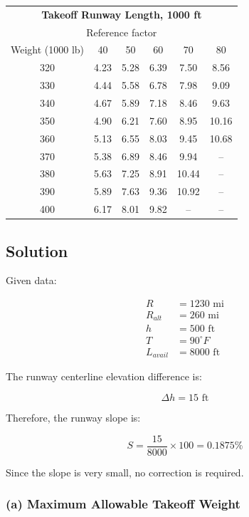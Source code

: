 \documentclass{KPS_assignment}
\begin{document}
\begin{table}[h!]
\begin{tabular}{c|ccccc}
\hline
\multicolumn{6}{c}{\textbf{Takeoff Runway Length, 1000 ft}} \\
\multicolumn{6}{c}{Reference factor} \\
Weight (1000 lb) & 40 & 50 & 60 & 70 & 80 \\
\hline
320 & 4.23 & 5.28 & 6.39 & 7.50 & 8.56 \\
330 & 4.44 & 5.58 & 6.78 & 7.98 & 9.09 \\
340 & 4.67 & 5.89 & 7.18 & 8.46 & 9.63 \\
350 & 4.90 & 6.21 & 7.60 & 8.95 & 10.16 \\
360 & 5.13 & 6.55 & 8.03 & 9.45 & 10.68 \\
370 & 5.38 & 6.89 & 8.46 & 9.94 & -- \\
380 & 5.63 & 7.25 & 8.91 & 10.44 & -- \\
390 & 5.89 & 7.63 & 9.36 & 10.92 & -- \\
400 & 6.17 & 8.01 & 9.82 & -- & -- \\
\hline
\end{tabular}

\end{table}

\subsection{Solution}

Given data:

\begin{align*}
R &= 1230 \text{ mi} \\
R_{alt} &= 260 \text{ mi} \\
h &= 500 \text{ ft} \\
T &= 90^\circ F \\
L_{avail} &= 8000 \text{ ft}
\end{align*}

The runway centerline elevation difference is:

\[
\Delta h = 15 \text{ ft}
\]

Therefore, the runway slope is:

\[
S=\frac{15}{8000}\times100=0.1875\%
\]

Since the slope is very small, no correction is required.

\subsubsection*{(a) Maximum Allowable Takeoff Weight}
\end{document}

